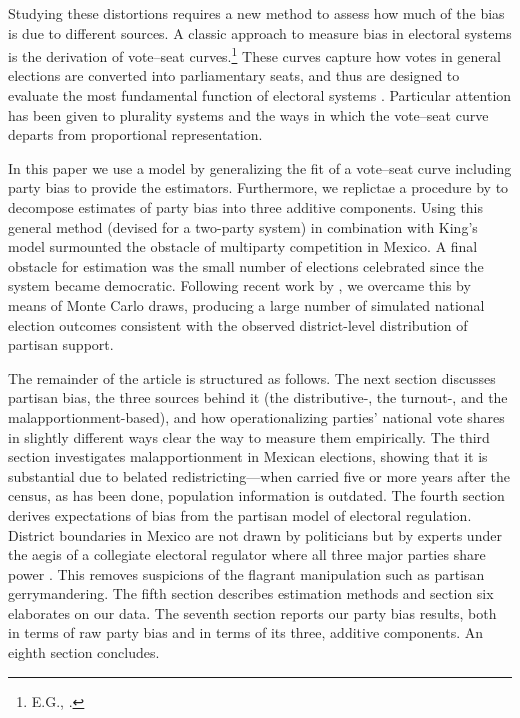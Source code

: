 \documentclass[letter,12pt]{article}
\begin{document}
Studying these distortions requires a new method to assess how much of the bias is due to different sources. A classic approach to measure bias in electoral systems is the derivation of vote--seat curves.\footnote{E.G., \citet{rae.1967,tufte1973seatsVotes,erikson1972malapportionment,dahl.1956prefDemoc,gudgin.taylor.1979seatsVotes,taagepera.shugart.1989,taagepera.CubeLaw.1973,king.1990elRespBiasMultiparty,king.browning1987biasRespUS,gelman.king.1994EvalElSysRedis}.} These curves capture how votes in general elections are converted into parliamentary seats, and thus are designed to evaluate the most fundamental function of electoral systems \citep{lijphartElSysPtySys.1994}. Particular attention has been given to plurality systems and the ways in which the vote--seat curve departs from proportional representation. 

In this paper we use a model by \citet{king.1990elRespBiasMultiparty} generalizing the fit of a vote--seat curve including party bias to provide the estimators. Furthermore, we replictae a procedure by \citet{grofman.etalBiasMalapp.1997} to decompose estimates of party bias into three additive components. Using this general method (devised for a two-party system) in combination with King's model surmounted the obstacle of multiparty competition in Mexico. A final obstacle for estimation was the small number of elections celebrated since the system became democratic. Following recent work by \citet{linzerSeatVoteElasticity2012}, we overcame this by means of Monte Carlo draws, producing a large number of simulated national election outcomes consistent with the observed district-level distribution of partisan support. 

The remainder of the article is structured as follows. The next section discusses partisan bias, the three sources behind it (the distributive-, the turnout-, and the malapportionment-based), and how operationalizing parties' national vote shares in slightly different ways clear the way to measure them empirically. The third section investigates malapportionment in Mexican elections, showing that it is substantial due to belated redistricting---when carried five or more years after the census, as has been done, population information is outdated. The fourth section derives expectations of bias from the partisan model of electoral regulation. District boundaries in Mexico are not drawn by politicians but by experts under the aegis of a collegiate electoral regulator where all three major parties share power \citep{estevez.magar.rosas.2008}. This removes suspicions of the flagrant manipulation such as partisan gerrymandering. The fifth section describes estimation methods and section six elaborates on our data. The seventh section reports our party bias results, both in terms of raw party bias and in terms of its three, additive components. An eighth section concludes. 
\end{document}
